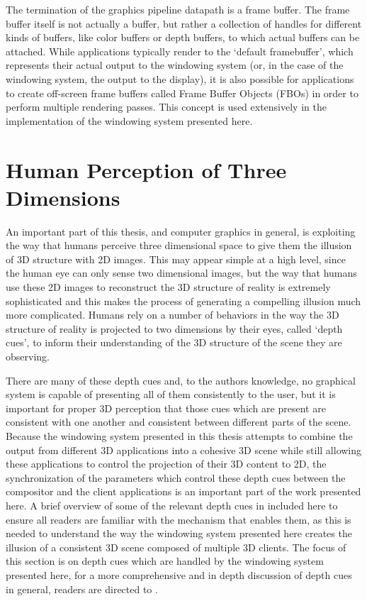 The termination of the graphics pipeline datapath is a frame buffer. The frame buffer itself is not actually a buffer, but rather a collection of handles for different kinds of buffers, like color buffers or depth buffers, to which actual buffers can be attached. While applications typically render to the ‘default framebuffer’, which represents their actual output to the windowing system (or, in the case of the windowing system, the output to the display), it is also possible for applications to create off-screen frame buffers called Frame Buffer Objects (FBOs) in order to perform multiple rendering passes. This concept is used extensively in the implementation of the windowing system presented here. 

\section{Human Perception of Three Dimensions}
\label{sec:depth-perception}

An important part of this thesis, and computer graphics in general, is exploiting the way that humans perceive three dimensional space to give them the illusion of 3D structure with 2D images. This may appear simple at a high level, since the human eye can only sense two dimensional images, but the way that humans use these 2D images to reconstruct the 3D structure of reality is extremely sophisticated and this makes the process of generating a compelling illusion much more complicated. Humans rely on a number of behaviors in the way the 3D structure of reality is projected to two dimensions by their eyes, called ‘depth cues’, to inform their understanding of the 3D structure of the scene they are observing.
	
There are many of these depth cues and, to the authors knowledge, no graphical system is capable of presenting all of them consistently to the user, but it is important for proper 3D perception that those cues which are present are consistent with one another and consistent between different parts of the scene. Because the windowing system presented in this thesis attempts to combine the output from different 3D applications into a cohesive 3D scene while still allowing these applications to control the projection of their 3D content to 2D, the synchronization of the parameters which control these depth cues between the compositor and the client applications is an important part of the work presented here. A brief overview of some of the relevant depth cues in included here to ensure all readers are familiar with the mechanism that enables them, as this is needed to understand the way the windowing system presented here creates the illusion of a consistent 3D scene composed of multiple 3D clients. The focus of this section is on depth cues which are handled by the windowing system presented here, for a more comprehensive and in depth discussion of depth cues in general, readers are directed to \cite{depth-cues}.

